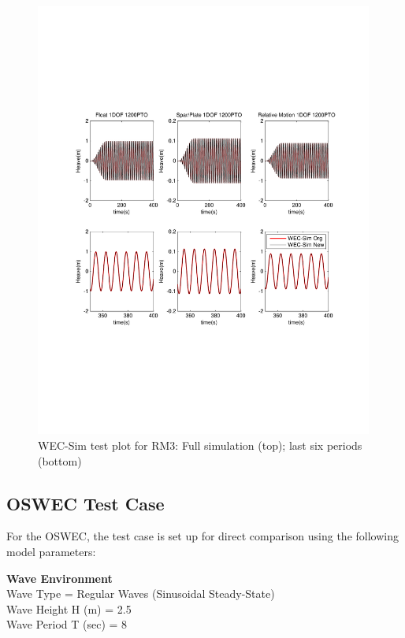         \begin{figure}[H]
        \centering
        \includegraphics[width=0.99\textwidth]{application/images/RM3_Test}
        \caption{WEC-Sim test plot for RM3: Full simulation (top); last six periods (bottom)}
        \label{RM3_Test}
        \end{figure}

\clearpage

\subsection{OSWEC Test Case}
For the OSWEC, the test case is set up for direct comparison using the following model parameters:

\textbf{Wave Environment}   \\
\indent	Wave Type                            = Regular Waves (Sinusoidal Steady-State) \\
	Wave Height H                    (m) = 2.5 \\ 
	Wave Period T                  (sec) = 8 \\

